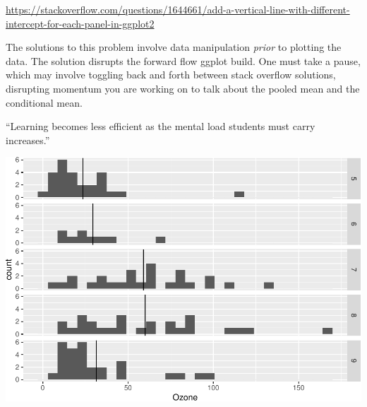 \documentclass[12pt]{article}
\newenvironment{Shaded}{\begin{snugshade}}{\end{snugshade}}
\newcommand{\DataTypeTok}[1]{\textcolor[rgb]{0.13,0.29,0.53}{#1}}
\newcommand{\KeywordTok}[1]{\textcolor[rgb]{0.13,0.29,0.53}{\textbf{#1}}}
\newcommand{\NormalTok}[1]{#1}
\newcommand{\OperatorTok}[1]{\textcolor[rgb]{0.81,0.36,0.00}{\textbf{#1}}}
\newcommand{\StringTok}[1]{\textcolor[rgb]{0.31,0.60,0.02}{#1}}
\begin{document}
\url{https://stackoverflow.com/questions/1644661/add-a-vertical-line-with-different-intercept-for-each-panel-in-ggplot2}

The solutions to this problem involve data manipulation \emph{prior} to
plotting the data. The solution disrupts the forward flow ggplot build.
One must take a pause, which may involve toggling back and forth between
stack overflow solutions, disrupting momentum you are working on to talk
about the pooled mean and the conditional mean.

``Learning becomes less efficient as the mental load students must carry
increases.'' \citep{lovett2000statscongnitive}

\begin{Shaded}
\end{Shaded}

\begin{center}\includegraphics[width=0.5\linewidth]{manuscript_files/figure-latex/unnamed-chunk-4-1} \end{center}
\end{document}
